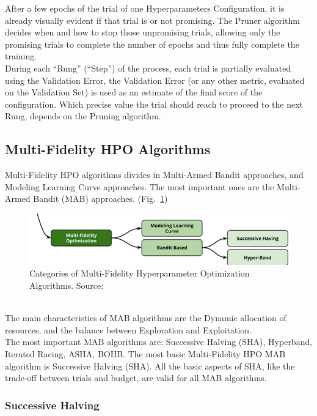 After a few epochs of the trial of one Hyperparameters Configuration, it is already visually evident if that trial is or not promising.
The Pruner algorithm decides when and how to stop those unpromising trials, allowing only the promising trials to complete the number of epochs and thus fully complete the training.
\\[0.3cm]During each “Rung” (“Step”) of the process, each trial is partially evaluated using the Validation Error, the Validation Error (or any other metric, evaluated on the Validation Set) is used as an estimate of the final score of the configuration.
Which precise value the trial should reach to proceed to the next Rung, depends on the Pruning algorithm.

\subsection{Multi-Fidelity HPO Algorithms}

Multi-Fidelity HPO algorithms divides in Multi-Armed Bandit approaches, and Modeling Learning Curve approaches. The most important ones are the Multi-Armed Bandit (MAB) approaches. (Fig.~\ref{fig:figure-2.3.2})
\begin{figure}[t]
	\centering
	\includegraphics[width=15cm]{figures/figure-2.3.2.png}
	\caption[Multi-Fidelity Hyperparameter Optimization Algorithms]{Categories of Multi-Fidelity Hyperparameter Optimization Algorithms. Source:~\cite{AutomatedML}}
	\label{fig:figure-2.3.2}
\end{figure}
\\[0.3cm]The main characteristics of MAB algorithms are the Dynamic allocation of resources, and the balance between Exploration and Exploitation.
\\[0.3cm]The most important MAB algorithms are: Successive Halving (SHA), Hyperband, Iterated Racing, ASHA, BOHB.
The most basic Multi-Fidelity HPO MAB algorithm is Successive Halving (SHA). All the basic aspects of SHA, like the trade-off between trials and budget, are valid for all MAB algorithms.

\subsubsection{Successive Halving}

